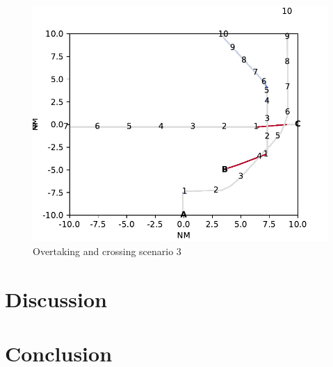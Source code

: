 \begin{figure}[h]
    \centering
    \includegraphics[width=\textwidth,height=0.75\textheight,keepaspectratio]{Figures/Scenario/overtaking-and-crossing-2-res.pdf}
    \caption{Overtaking and crossing scenario 3}
    \label{fig:overtaking-and-crossing-2-res}
\end{figure}

\chapter{Discussion}
\label{chap:disc}
\chapter{Conclusion}
